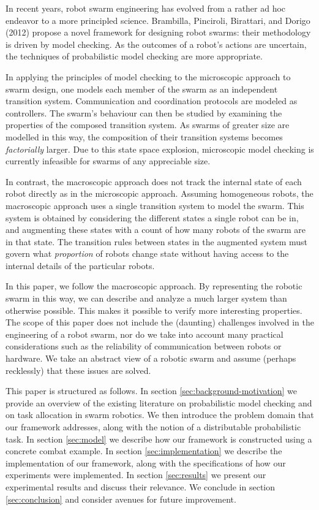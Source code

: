 \documentclass[11pt]{article}
\theoremstyle{definition}
\begin{document}
In recent years, robot swarm engineering has evolved from a rather ad hoc
endeavor to a more principled science.
Brambilla, Pinciroli, Birattari, and Dorigo (2012) propose a novel framework
for designing robot swarms: their
methodology is driven by model checking.
As the outcomes of a robot's actions are uncertain, the techniques of
probabilistic model checking are more appropriate.

In applying the principles of model checking to the microscopic approach to
swarm design, one models each member of the swarm as an independent transition
system.
Communication and coordination protocols are modeled as controllers.
The swarm's behaviour can then be studied by examining the properties of the
composed transition system.
As swarms of greater size are modelled in this way, the composition of their
transition systems becomes \emph{factorially} larger.
Due to this state space explosion, microscopic model checking is currently
infeasible for swarms of any appreciable size.

In contrast, the macroscopic approach does not track the internal state of each
robot directly as in the microscopic approach.
Assuming homogeneous robots, the macroscopic approach uses a single
transition system to model the swarm.
This system is obtained by considering the different states a single robot can
be in, and augmenting these states with a count of how many robots of the swarm
are in that state.
The transition rules between states in the augmented system must
govern what \emph{proportion} of robots change state without having access to
the internal details of the particular robots.

In this paper, we follow the macroscopic approach.
By representing the robotic swarm in this way, we can describe and analyze a
much larger system than otherwise possible.
This makes it possible to verify more interesting properties.
%
The scope of this paper does not include the (daunting) challenges involved in
the engineering of a robot swarm, nor do we take into account many practical
considerations such as the reliability of communication between robots or
hardware.
We take an abstract view of a robotic swarm and assume (perhaps recklessly)
that these issues are solved.

This paper is structured as follows.
%
In section \ref{sec:background-motivation} we provide an overview of the
existing literature on probabilistic model checking and on task allocation in
swarm robotics.
We then introduce the problem domain that our framework addresses, along with
the notion of a distributable probabilistic task.
%
In section \ref{sec:model} we describe how our framework is constructed using a
concrete combat example.
%
In section \ref{sec:implementation} we describe the implementation of our
framework, along with the specifications of how our experiments were
implemented.
%
In section \ref{sec:results} we present our experimental results and discuss
their relevance.
%
We conclude in section \ref{sec:conclusion} and consider avenues for future
improvement.
\end{document}
